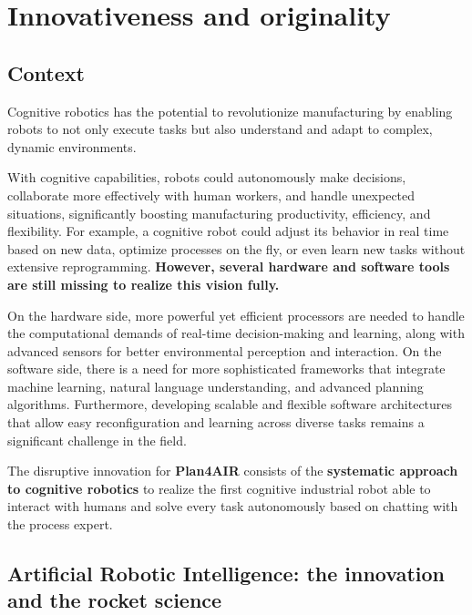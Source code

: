 \section{\texorpdfstring{Innovativeness and originality}{Innovativeness and originality }}\label{innovativeness-and-originality}

\subsection{Context}\label{context-1}

Cognitive robotics has the potential to revolutionize manufacturing by
enabling robots to not only execute tasks but also understand and adapt
to complex, dynamic environments.

With cognitive capabilities, robots could autonomously make decisions,
collaborate more effectively with human workers, and handle unexpected
situations, significantly boosting manufacturing productivity,
efficiency, and flexibility. For example, a cognitive robot could adjust
its behavior in real time based on new data, optimize processes on the
fly, or even learn new tasks without extensive reprogramming.
\textbf{However, several hardware and software tools are still missing
to realize this vision fully.}

On the hardware side, more powerful yet efficient processors are needed
to handle the computational demands of real-time decision-making and
learning, along with advanced sensors for better environmental
perception and interaction. On the software side, there is a need for
more sophisticated frameworks that integrate machine learning, natural
language understanding, and advanced planning algorithms. Furthermore,
developing scalable and flexible software architectures that allow easy
reconfiguration and learning across diverse tasks remains a significant
challenge in the field.

The disruptive innovation for \textbf{Plan4AIR} consists of the
\textbf{systematic approach to cognitive robotics} to realize the first
cognitive industrial robot able to interact with humans and solve every
task autonomously based on chatting with the process expert.

\subsection{Artificial Robotic Intelligence: the innovation and the
rocket
science}\label{artificial-robotic-intelligence-the-innovation-and-the-rocket-science}


